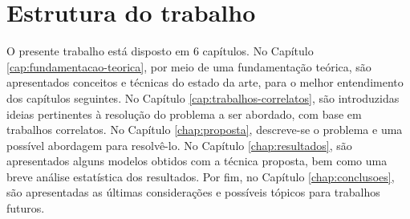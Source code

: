 \section{Estrutura do trabalho}
\label{sec:estrutura_trabalho}

O presente trabalho está disposto em 6 capítulos. No Capítulo \ref{cap:fundamentacao-teorica}, por meio de uma fundamentação teórica, são apresentados conceitos e técnicas do estado da arte, para o melhor entendimento dos capítulos seguintes. No Capítulo \ref{cap:trabalhos-correlatos}, são introduzidas ideias pertinentes à resolução do problema a ser abordado, com base em trabalhos correlatos. No Capítulo \ref{chap:proposta}, descreve-se o problema e uma possível abordagem para resolvê-lo. No Capítulo \ref{chap:resultados}, são apresentados alguns modelos obtidos com a técnica proposta, bem como uma breve análise estatística dos resultados. Por fim, no Capítulo \ref{chap:conclusoes}, são apresentadas as últimas considerações e possíveis tópicos para trabalhos futuros.